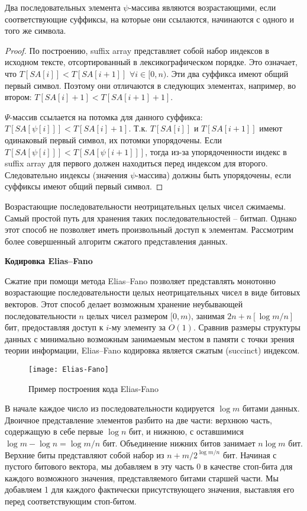 \begin{theorem}
 Два последовательных элемента $\psi$-массива являются возрастающими, если соответствующие суффиксы,
 на которые они ссылаются, начинаются с одного и того же символа.
\end{theorem}

\begin{proof}
 По построению, suffix array представляет собой набор индексов в исходном тексте,
 отсортированный в лексикографическом порядке. Это означает, что $T[SA[i]] < T[SA[i + 1]]$
 $\forall i \in [0, n).$ Эти два суффикса имеют общий первый символ. Поэтому они отличаются в следующих
 элементах, например, во втором: $T[SA[i] + 1] < T[SA[i + 1] + 1].$

 $\Psi$-массив ссылается на потомка для данного суффикса: $T[SA[\psi[i]]] < T[SA[i] + 1].$
 Т.к. $T[SA[i]]$ и $T[SA[i + 1]]$ имеют одинаковый первый символ, их потомки упорядочены.
 Если $T[SA[\psi[i]]] < T[SA[\psi[i + 1]]]$, тогда из-за упорядоченности индекс в suffix array
 для первого должен находиться перед индексом для второго. Следовательно индексы (значения $\psi$-массива)
 должны быть упорядочены, если суффиксы имеют общий первый символ.
\end{proof}

Возрастающие последовательности неотрицательных целых чисел сжимаемы.
Самый простой путь для хранения таких последовательностей -- битмап.
Однако этот способ не позволяет иметь произвольный доступ к элементам.
Рассмотрим более совершенный алгоритм сжатого представления данных.

\textbf{Кодировка Elias--Fano}

Сжатие при помощи метода Elias--Fano позволяет представлять монотонно возрастающие последовательности
целых неотрицательных чисел в виде битовых векторов. Этот способ делает возможным
хранение неубывающей последовательности $n$ целых чисел размером $[0, m)$,
занимая $2n + n[\log m/n]$ бит, предоставляя доступ к $i$-му элементу за $O(1)$.
Сравнив размеры структуры данных с минимально возможным занимаемым местом в памяти
с точки зрения теории информации, Elias--Fano кодировка является сжатым (succinct) индексом.

\begin{figure}[t]
 \texttt{[image: Elias-Fano]}
 \caption{Пример построения кода Elias-Fano}
 \centering
 \label{fig:EF}
\end{figure}

В начале каждое число из последовательности кодируется $\log m$ битами данных.
Двоичное представление элементов разбито на две части: верхнюю часть, содержащую в себе
первые $\log n$ бит, и нижнюю, с оставшимися $\log m - \log n = \log m / n$ бит.
Объединение нижних битов занимает $n \log m$ бит. Верхние биты представляют собой
набор из $n + m / 2^{\log m/n}$ бит. Начиная с пустого битового вектора, мы добавляем в эту часть 0
в качестве стоп-бита для каждого возможного значения, представляемого битами старшей части.
Мы добавляем 1 для каждого фактически присутствующего значения, выставляя его перед соответствующим стоп-битом.

